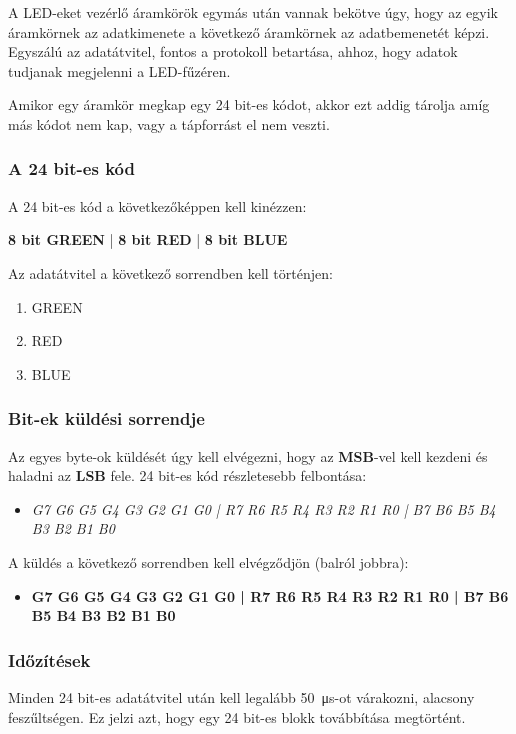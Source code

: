 \tab A LED-eket vezérlő áramkörök egymás után vannak bekötve úgy, hogy az egyik áramkörnek az adatkimenete a következő áramkörnek az adatbemenetét képzi.
Egyszálú az adatátvitel, fontos a protokoll betartása, ahhoz, hogy adatok tudjanak megjelenni a LED-fűzéren.

\tab Amikor egy áramkör megkap egy 24 bit-es kódot, akkor ezt addig tárolja amíg más kódot nem kap, vagy a tápforrást el nem veszti.

\subsubsection{A 24 bit-es kód}

\tab A 24 bit-es kód a következőképpen kell kinézzen: 

\tab \textbf{8 bit GREEN} | \textbf{8 bit RED} | \textbf{8 bit BLUE}

\tab Az adatátvitel a következő sorrendben kell történjen: 
\begin{enumerate}
\item GREEN
\item RED
\item BLUE
\end{enumerate}

\subsubsection{Bit-ek küldési sorrendje}

\tab Az egyes byte-ok küldését úgy kell elvégezni, hogy az \textbf{MSB}-vel kell kezdeni és haladni az \textbf{LSB} fele. 
24 bit-es kód részletesebb felbontása: 
\begin{itemize}
\item \textit{G7 G6 G5 G4 G3 G2 G1 G0 | R7 R6 R5 R4 R3 R2 R1 R0 | B7 B6 B5 B4 B3 B2 B1 B0}
\end{itemize}

\tab A küldés a következő sorrendben kell elvégződjön (balról jobbra): 
\begin{itemize}
\item \textbf{G7 G6 G5 G4 G3 G2 G1 G0 | R7 R6 R5 R4 R3 R2 R1 R0 | B7 B6 B5 B4 B3 B2 B1 B0}
\end{itemize}

\subsubsection{Időzítések}

\tab Minden 24 bit-es adatátvitel után kell legalább \SI{50}{\micro\second}-ot várakozni, alacsony feszűltségen. Ez jelzi azt, hogy egy 24 bit-es blokk továbbítása megtörtént.

